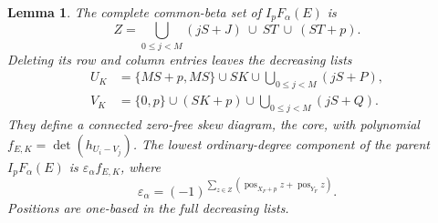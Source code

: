 \documentclass[11pt,a4paper]{amsart}
\numberwithin{equation}{section}
\theoremstyle{plain}
\newtheorem{lemma}[theorem]{Lemma}
\theoremstyle{definition}
\begin{document}
\begin{lemma}\label{lem:wall-lists}
The complete common-beta set of \(I_pF_\alpha(E)\) is
\[
 Z=\bigcup_{0\le j<M}(jS+J)\ \cup\ ST\ \cup\ (ST+p).
\]
Deleting its row and column entries leaves the decreasing lists
\begin{equation}\label{eq:core-lists}
 \begin{aligned}
 U_K&=\{MS+p,MS\}\cup SK\cup\bigcup_{0\le j<M}(jS+P),\\
 V_K&=\{0,p\}\cup(SK+p)\cup\bigcup_{0\le j<M}(jS+Q).
 \end{aligned}
\end{equation}
They define a connected zero-free skew diagram, the core, with polynomial \(f_{E,K}=\det(h_{U_i-V_j})\).  The lowest ordinary-degree component of the parent \(I_pF_\alpha(E)\) is \(\varepsilon_\alpha f_{E,K}\), where
\begin{equation}\label{eq:contact-sign}
 \varepsilon_\alpha=(-1)^{\sum_{z\in Z}
 (\operatorname{pos}_{X_F+p}z+\operatorname{pos}_{Y_F}z)}.
\end{equation}
Positions are one-based in the full decreasing lists.
\end{lemma}
\end{document}

